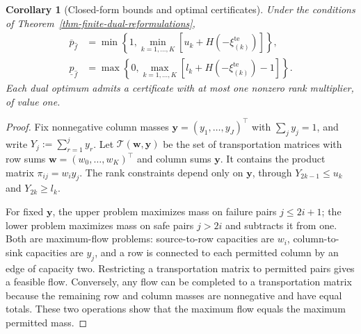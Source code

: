\documentclass[review,11pt,3p,authoryear,nopreprintline]{elsarticle}
\newtheorem{corollary}{Corollary}
\begin{document}
\begin{corollary}[Closed-form bounds and optimal certificates]
  \label{thm-closed-form-bounds}
  Under the conditions of Theorem~\ref{thm-finite-dual-reformulations},
  \begin{align}
    \overline p_{\hat f}
    &=\min\left\{1,\min_{k=1,\ldots,K}[u_k+H\left(-\xi_{(k)}^{\mathrm{te}}\right)]\right\},
    \label{eq-dw-closed-upper}\\
    \underline p_{\hat f}
    &=\max\left\{0,\max_{k=1,\ldots,K}[l_k+H\left(-\xi_{(k)}^{\mathrm{te}}\right)-1]\right\}.
    \label{eq-dw-closed-lower}
  \end{align}
  Each dual optimum admits a certificate with at most one nonzero rank multiplier, of value one.
\end{corollary}
\begin{proof}
  Fix nonnegative column masses $\bm y=(y_1,\ldots,y_J)^\top$ with $\sum_j y_j=1$, and write $Y_j:=\sum_{r=1}^j y_r$. Let $\mathcal T(\bm w,\bm y)$ be the set of transportation matrices with row sums $\bm w=(w_0,\ldots,w_K)^\top$ and column sums $\bm y$. It contains the product matrix $\pi_{ij}=w_i y_j$. The rank constraints depend only on $\bm y$, through $Y_{2k-1}\le u_k$ and $Y_{2k}\ge l_k$.

  For fixed $\bm y$, the upper problem maximizes mass on failure pairs $j\le2i+1$; the lower problem maximizes mass on safe pairs $j>2i$ and subtracts it from one. Both are maximum-flow problems: source-to-row capacities are $w_i$, column-to-sink capacities are $y_j$, and a row is connected to each permitted column by an edge of capacity two. Restricting a transportation matrix to permitted pairs gives a feasible flow. Conversely, any flow can be completed to a transportation matrix because the remaining row and column masses are nonnegative and have equal totals. These two operations show that the maximum flow equals the maximum permitted mass.


\end{proof}
\end{document}
